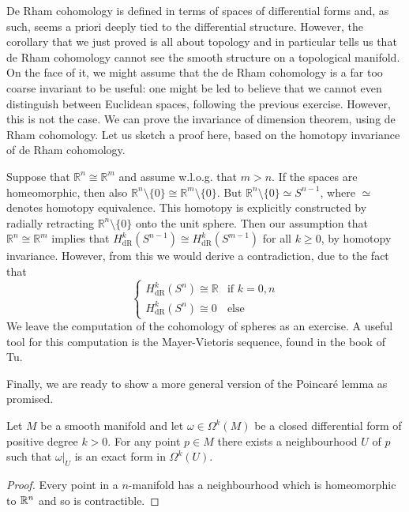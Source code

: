 \begin{remark}
De Rham cohomology is defined in terms of spaces of differential forms and, as such, seems a priori deeply tied to the differential structure. However, the corollary that we just proved is all about topology and in particular tells us that de Rham cohomology cannot see the smooth structure on a topological manifold. On the face of it, we might assume that the de Rham cohomology is a far too coarse invariant to be useful: one might be led to believe that we cannot even distinguish between Euclidean spaces, following the previous exercise. However, this is not the case. We can prove the invariance of dimension theorem, using de Rham cohomology. Let us sketch a proof here, based on the homotopy invariance of de Rham cohomology.\par
Suppose that $\mathbb{R}^n\cong\mathbb{R}^m$ and assume w.l.o.g. that $m>n$. If the spaces are homeomorphic, then also $\mathbb{R}^n\setminus\{0\}\cong\mathbb{R}^m\setminus\{0\}$. But $\mathbb{R}^n\setminus\{0\}\simeq S^{n-1}$, where $\simeq$ denotes homotopy equivalence. This homotopy is explicitly constructed by radially retracting $\mathbb{R}^n\setminus\{0\}$ onto the unit sphere. Then our assumption that $\mathbb{R}^n\cong\mathbb{R}^m$ implies that $H^k_{\mathrm{dR}}(S^{n-1})\cong H^k_{\mathrm{dR}}(S^{m-1})$ for all $k\geq 0$,
by homotopy invariance. However, from this we would derive a contradiction, due to the fact that
$$\begin{cases}H_{\mathrm{dR}}^k(S^n)\cong\mathbb{R} & \text{if }k=0,n\\
H_{\mathrm{dR}}^k(S^n)\cong 0 & \text{else}\end{cases}$$
We leave the computation of the cohomology of spheres as an exercise. A useful tool for this computation is the Mayer-Vietoris sequence, found in the book of Tu.
\end{remark}

Finally, we are ready to show a more general version of the Poincar\'e lemma as promised.

\begin{corollary}\label{cor:plemma}
  Let $M$ be a smooth manifold and let $\omega\in\Omega^k(M)$ be a closed differential form of positive degree $k>0$.
  For any point $p\in M$ there exists a neighbourhood $U$ of $p$ such that $\omega|_U$ is an exact form in $\Omega^k(U)$.
\end{corollary}
\begin{proof}
Every point in a $n$-manifold has a neighbourhood which is homeomorphic to $\mathbb{R}^n$ and so is contractible.
\end{proof}
